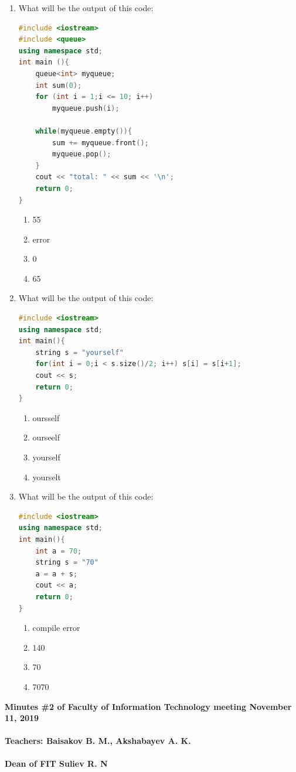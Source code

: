 \documentclass[10pt]{article}
\begin{document}
\begin{enumerate}
\item What will be the output of this code:
\begin{lstlisting}[language=C++]
#include <iostream>
#include <queue>       
using namespace std;   
int main (){
    queue<int> myqueue;
    int sum(0);
    for (int i = 1;i <= 10; i++) 
        myqueue.push(i);

    while(myqueue.empty()){
        sum += myqueue.front();
        myqueue.pop();
    }
    cout << "total: " << sum << '\n';
    return 0;
}

\end{lstlisting}
\begin{multicols}{4}
\begin{enumerate}
    \item 55
    \item error
    \item 0
    \item 65
\end{enumerate}
\end{multicols}








\item What will be the output of this code:
\begin{lstlisting}[language=C++]
#include <iostream> 
using namespace std;
int main(){
    string s = "yourself"
    for(int i = 0;i < s.size()/2; i++) s[i] = s[i+1];
    cout << s;
    return 0;
}
\end{lstlisting}
\begin{multicols}{4}
\begin{enumerate}
    \item oursself
    \item ourseelf
    \item yourself
    \item yourselt
\end{enumerate}
\end{multicols}








\item What will be the output of this code:
\begin{lstlisting}[language=C++]
#include <iostream>
using namespace std;
int main(){
	int a = 70;
	string s = "70"
	a = a + s;
	cout << a;
    return 0;
}

\end{lstlisting}
\begin{multicols}{4}
\begin{enumerate}
    \item compile error
    \item 140
    \item 70
    \item 7070
\end{enumerate}
\end{multicols}



\end{enumerate}
\textbf{
Minutes \#2 of Faculty of Information Technology meeting November 11, 2019 \\\\
Teachers: Baisakov B. M., Akshabayev A. K. \\\\ 
Dean of FIT Suliev R. N \\\\
}
\end{document}
